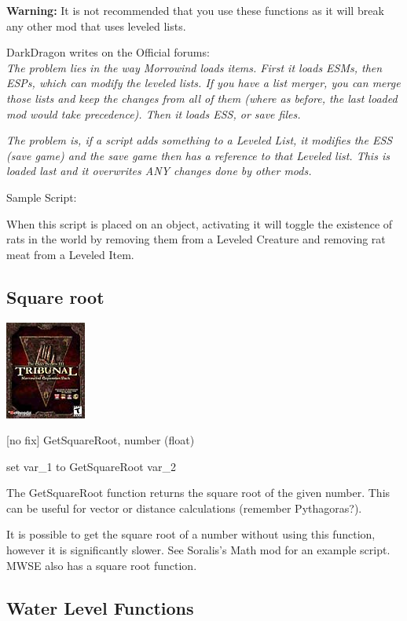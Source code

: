 \textbf{Warning:} It is not recommended that you use these functions as
it will break any other mod that uses leveled lists.

DarkDragon writes on the Official forums:\\
\emph{The problem lies in the way Morrowind loads items. First it loads
ESMs, then ESPs, which can modify the leveled lists. If you have a list
merger, you can merge those lists and keep the changes from all of them
(where as before, the last loaded mod would take precedence). Then it
loads ESS, or save files.}

\emph{\hfill\break
The problem is, if a script adds something to a Leveled List, it
modifies the ESS (save game) and the save game then has a reference to
that Leveled list. This is loaded last and it overwrites ANY changes
done by other mods.}

Sample Script:

When this script is placed on an object, activating it will toggle the
existence of rats in the world by removing them from a Leveled Creature
and removing rat meat from a Leveled Item.



\hypertarget{square-root}{%
\subsection{Square root}\label{square-root}}

\includegraphics{media/image6.png}

{[}no fix{]} GetSquareRoot, number (float)

set var\_1 to GetSquareRoot var\_2

The GetSquareRoot function returns the square root of the given number.
This can be useful for vector or distance calculations (remember
Pythagoras?).

It is possible to get the square root of a number without using this
function, however it is significantly slower. See Soralis's Math mod for
an example script. MWSE also has a square root function.

\hypertarget{water-level-functions}{%
\subsection{Water Level Functions}\label{water-level-functions}}

